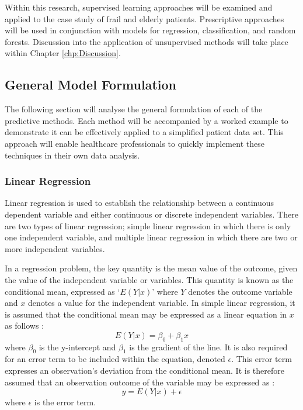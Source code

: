 \documentclass[../thesis.tex]{subfiles}
\begin{document}
Within this research, supervised learning approaches will be examined and applied to the case study of frail and elderly patients. Prescriptive approaches will be used in conjunction with models for regression, classification, and random forests. Discussion into the application of unsupervised methods will take place within Chapter \ref{chp:Discussion}.

\subsection{General Model Formulation}
The following section will analyse the general formulation of each of the predictive methods. Each method will be accompanied by a worked example to demonstrate it can be effectively applied to a simplified patient data set. This approach will enable healthcare professionals to quickly implement these techniques in their own data analysis.

\subsubsection{Linear Regression}
Linear regression is used to establish the relationship between a continuous dependent variable and either continuous or discrete independent variables. There are two types of linear regression; simple linear regression in which there is only one independent variable, and multiple linear regression in which there are two or more independent variables.

In a regression problem, the key quantity is the mean value of the outcome, given the value of the independent variable or variables. This quantity is known as the conditional mean, expressed as `$E(Y | x)$' where $Y$ denotes the outcome variable and $x$ denotes a value for the independent variable. In simple linear regression, it is assumed that the conditional mean may be expressed as a linear equation in $x$ as follows \cite{Hosmer1989,Wasserman2004}:
\begin{equation}\label{eq:linreg}
    E(Y | x) = \beta_{0} +\beta_{1}x
\end{equation}
where $\beta_{0}$ is the y-intercept and $\beta_{1}$ is the gradient of the line. 
It is also required for an error term to be included within the equation, denoted $\epsilon$. This error term expresses an observation's deviation from the conditional mean. It is therefore assumed that an observation outcome of the variable may be expressed as \cite{Hosmer1989, Wasserman2004}:
\begin{equation}
    y = E(Y | x) + \epsilon
\end{equation}
where $\epsilon$ is the error term.
\end{document}
